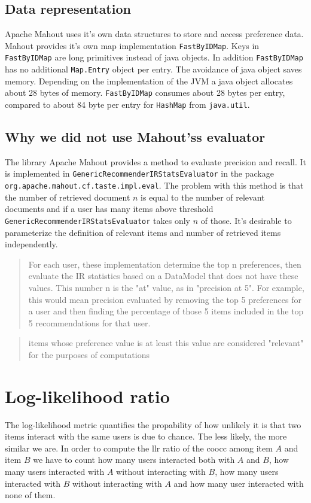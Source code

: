\documentclass[twoside,a4paper]{article}
\begin{document}
\subsection{Data representation}
\label{sec:datarepresentation}

Apache Mahout uses it's own data structures to store and access preference data. Mahout provides it's own map implementation \verb|FastByIDMap|. Keys in \verb|FastByIDMap| are long primitives instead of java objects. In addition \verb|FastByIDMap| has no additional \verb|Map.Entry| object per entry. The avoidance of java object saves memory. Depending on the implementation of the JVM a java object allocates about 28 bytes of memory. \verb|FastByIDMap| consumes about 28 bytes per entry, compared to about 84 byte per entry for \verb|HashMap| from \verb|java.util|.

\subsection{Why we did not use Mahout'ss evaluator}
\label{sec:mahouteval}

The library Apache Mahout provides a method to evaluate precision and recall. It is implemented in 
 \verb|GenericRecommenderIRStatsEvaluator| in the package \verb|org.apache.mahout.cf.taste.impl.eval|. The problem with this method is that the number of retrieved document $n$ is equal to the number of relevant documents and if a user has many items above threshold  \verb|GenericRecommenderIRStatsEvaluator| takes only $n$ of those. It's desirable to parameterize the definition of relevant items and number of retrieved items independently.

\begin{quote}
For each user, these implementation determine the top n preferences, then evaluate the IR statistics based on a DataModel that does not have these values. This number n is the "at" value, as in "precision at 5". For example, this would mean precision evaluated by removing the top 5 preferences for a user and then finding the percentage of those 5 items included in the top 5 recommendations for that user. 
\end{quote}

\begin{quote}
  items whose preference value is at least this value are considered "relevant" for the purposes of computations
\end{quote}

\section{Log-likelihood ratio}
\label{sec:llrratio}
The log-likelihood metric quantifies the propability of how
unlikely it is that two items interact with the same users is due to chance. The less likely, the more similar we are.
In order to compute the \gls{llr} ratio of the \gls{coocc} among item $A$ and item $B$ we have to count how many users interacted both with $A$ and $B$, how many users interacted with $A$ without interacting with $B$, how many users interacted with $B$ without interacting with $A$ and how many user interacted with none of them.
\end{document}
